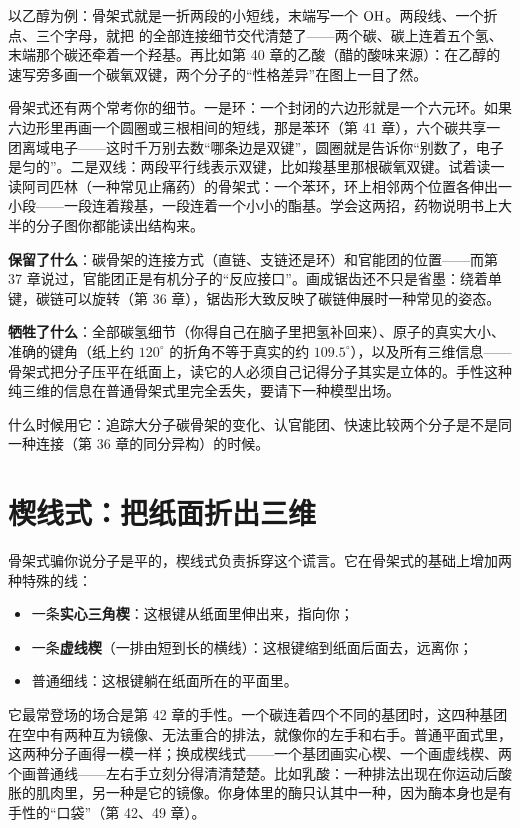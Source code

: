 以乙醇为例：骨架式就是一折两段的小短线，末端写一个 $\mathrm{OH}$。两段线、一个折点、三个字母，就把  的全部连接细节交代清楚了——两个碳、碳上连着五个氢、末端那个碳还牵着一个羟基。再比如第 40 章的乙酸（醋的酸味来源）：在乙醇的速写旁多画一个碳氧双键，两个分子的“性格差异”在图上一目了然。

骨架式还有两个常考你的细节。一是环：一个封闭的六边形就是一个六元环。如果六边形里再画一个圆圈或三根相间的短线，那是苯环（第 41 章），六个碳共享一团离域电子——这时千万别去数“哪条边是双键”，圆圈就是告诉你“别数了，电子是匀的”。二是双线：两段平行线表示双键，比如羧基里那根碳氧双键。试着读一读阿司匹林（一种常见止痛药）的骨架式：一个苯环，环上相邻两个位置各伸出一小段——一段连着羧基，一段连着一个小小的酯基。学会这两招，药物说明书上大半的分子图你都能读出结构来。

\textbf{保留了什么}：碳骨架的连接方式（直链、支链还是环）和官能团的位置——而第 37 章说过，官能团正是有机分子的“反应接口”。画成锯齿还不只是省墨：绕着单键，碳链可以旋转（第 36 章），锯齿形大致反映了碳链伸展时一种常见的姿态。

\textbf{牺牲了什么}：全部碳氢细节（你得自己在脑子里把氢补回来）、原子的真实大小、准确的键角（纸上约 $120^{\circ}$ 的折角不等于真实的约 $109.5^{\circ}$），以及所有三维信息——骨架式把分子压平在纸面上，读它的人必须自己记得分子其实是立体的。手性这种纯三维的信息在普通骨架式里完全丢失，要请下一种模型出场。

什么时候用它：追踪大分子碳骨架的变化、认官能团、快速比较两个分子是不是同一种连接（第 36 章的同分异构）的时候。

\section{楔线式：把纸面折出三维}

骨架式骗你说分子是平的，楔线式负责拆穿这个谎言。它在骨架式的基础上增加两种特殊的线：

\begin{itemize}[itemsep=2pt]
\item 一条\textbf{实心三角楔}：这根键从纸面里伸出来，指向你；
\item 一条\textbf{虚线楔}（一排由短到长的横线）：这根键缩到纸面后面去，远离你；
\item 普通细线：这根键躺在纸面所在的平面里。
\end{itemize}

它最常登场的场合是第 42 章的手性。一个碳连着四个不同的基团时，这四种基团在空中有两种互为镜像、无法重合的排法，就像你的左手和右手。普通平面式里，这两种分子画得一模一样；换成楔线式——一个基团画实心楔、一个画虚线楔、两个画普通线——左右手立刻分得清清楚楚。比如乳酸：一种排法出现在你运动后酸胀的肌肉里，另一种是它的镜像。你身体里的酶只认其中一种，因为酶本身也是有手性的“口袋”（第 42、49 章）。

